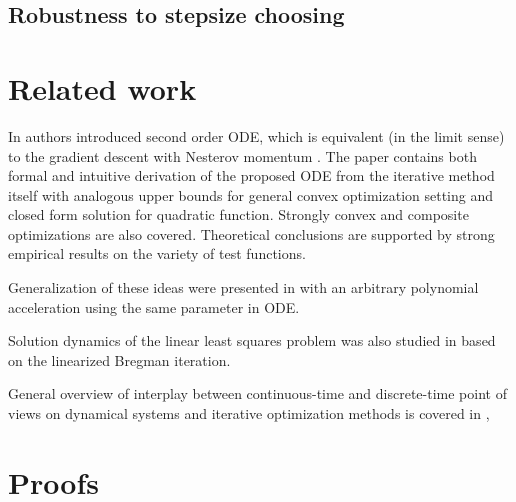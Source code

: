 \documentclass{article}
\begin{document}
\subsection{Robustness to stepsize choosing}



\section{Related work}

In \cite{su2014differential} authors introduced second order ODE, which is equivalent (in the limit sense) to the gradient descent with Nesterov momentum \cite{nesterov1983method}. The paper contains both formal and intuitive derivation of the proposed ODE from the iterative method itself with analogous upper bounds for general convex optimization setting and closed form solution for quadratic function. Strongly convex and composite optimizations are also covered. Theoretical conclusions are supported by strong empirical results on the variety of test functions.

Generalization of these ideas were presented in \cite{wibisono2016variational} with an arbitrary polynomial acceleration using the same parameter in ODE.

Solution dynamics of the linear least squares problem was also studied in \cite{osher2016sparse} based on the linearized Bregman iteration.

General overview of interplay between continuous-time and discrete-time point of views on dynamical systems and iterative optimization methods is covered in \cite{helmke2012optimization}, \cite{evtushenko1994stable}







\appendix
\section{Proofs}
\end{document}

